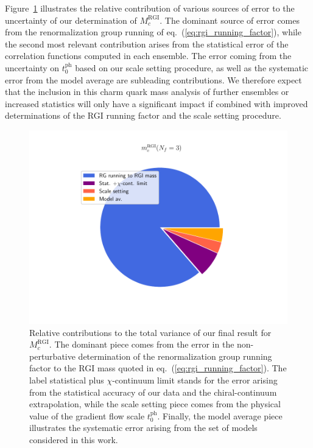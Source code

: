 Figure~\ref{fig:mc_error_contributions} illustrates the relative contribution of various sources of error to the
uncertainty of our determination of $M_c^{\mathrm{RGI}}$. The dominant source of error comes from the 
renormalization group running of eq.~(\ref{eq:rgi_running_factor}), while the second most relevant 
contribution arises from the statistical error of  the correlation functions computed in each ensemble.  
The  error coming from  the uncertainty on $t_0^{\mathrm{ph}}$ based on our  scale setting  procedure, as well as the 
systematic error from the model average  are subleading contributions. We therefore expect
that the 
inclusion in this charm quark mass analysis of further ensembles or increased statistics will only have a significant impact if combined with improved determinations of the RGI running factor and the scale setting procedure.
%
\begin{figure}
	\centering
	\includegraphics[scale=0.5]{./cap6/figs/mc/mc_error_pie.pdf}
	\caption{Relative contributions to the total variance of our final result for $M_c^{\mathrm{RGI}}$. The dominant piece comes from the error in the non-perturbative determination of the renormalization group running factor to the RGI mass quoted in eq.~(\ref{eq:rgi_running_factor}). The label statistical plus $\chi$-continuum limit stands for the error arising from the statistical accuracy of our data and the chiral-continuum extrapolation, while the scale setting piece comes from the physical value of the gradient flow scale $t_0^{\mathrm{ph}}$. Finally, the model average piece illustrates the systematic error arising from the set of models considered in this work.
          }
	\label{fig:mc_error_contributions}
\end{figure}
%

